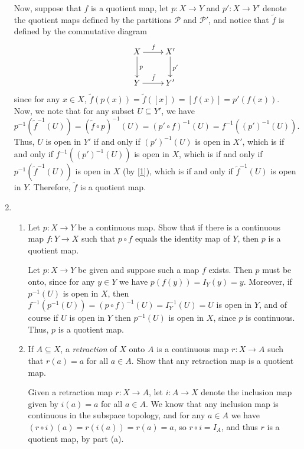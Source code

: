 \documentclass[letterpaper,12pt]{article}
\begin{document}
\begin{enumerate}
Now, suppose that $f$ is a quotient map, let $p:X\to Y$ and $p':X\to Y'$ denote the quotient maps defined by the partitions $\mathcal{P}$ and $\mathcal{P}'$, and notice that $\tilde{f}$ is defined by the commutative diagram
\[
\xymatrix{ X \ar[r]^f \ar[d]^p & X' \ar[d]^{p'}\\ Y \ar[r]^{\tilde{f}} & Y'}
\]
since for any $x\in X$, $\tilde{f}(p(x)) = \tilde{f}([x]) = [f(x)] = p'(f(x))$. Now, we note that for any subset $U\subseteq Y'$, we have 
\begin{equation}\label{1}
p^{-1}(\tilde{f}^{-1}(U)) = (\tilde{f}\circ p)^{-1}(U) = (p'\circ f)^{-1}(U) = f^{-1}((p')^{-1}(U)).
\end{equation}
Thus, $U$ is open in $Y'$ if and only if $(p')^{-1}(U)$ is open in $X'$, which is if and only if $f^{-1}((p')^{-1}(U))$ is open in $X$, which is if and only if $p^{-1}(\tilde{f}^{-1}(U))$ is open in $X$ (by \eqref{1}), which is if and only if $\tilde{f}^{-1}(U)$ is open in $Y$.
Therefore, $\tilde{f}$ is a quotient map.

 \bigskip
 
 
 \item \begin{enumerate}
        \item Let $p:X\to Y$ be a continuous map. Show that if there is a continuous map $f:Y\to X$ such that $p\circ f$ equals the identity map of $Y$, then $p$ is a quotient map.
        
 \bigskip
 
 Let $p:X\to Y$ be given and suppose such a map $f$ exists. Then $p$ must be onto, since for any $y\in Y$ we have $p(f(y)) = I_Y(y)=y$. Moreover, if $p^{-1}(U)$ is open in $X$, then $f^{-1}(p^{-1}(U)) = (p\circ f)^{-1}(U) = I_Y^{-1}(U) = U$ is open in $Y$, and of course if $U$ is open in $Y$ then $p^{-1}(U)$ is open in $X$, since $p$ is continuous. Thus, $p$ is a quotient map.
 
 \bigskip
 
        \item If $A\subseteq X$, a {\em retraction} of $X$ onto $A$ is a continuous map $r:X\to A$ such that $r(a)=a$ for all $a\in A$. Show that any retraction map is a quotient map.

\bigskip

Given a retraction map $r:X\to A$, let $i:A\to X$ denote the inclusion map given by $i(a)=a$ for all $a\in A$. We know that any inclusion map is continuous in the subspace topology, and for any $a\in A$ we have $(r\circ i)(a) = r(i(a)) = r(a) = a$, so $r\circ i = I_A$, and thus $r$ is a quotient map, by part (a).
       \end{enumerate}

\end{enumerate}
\end{document}
